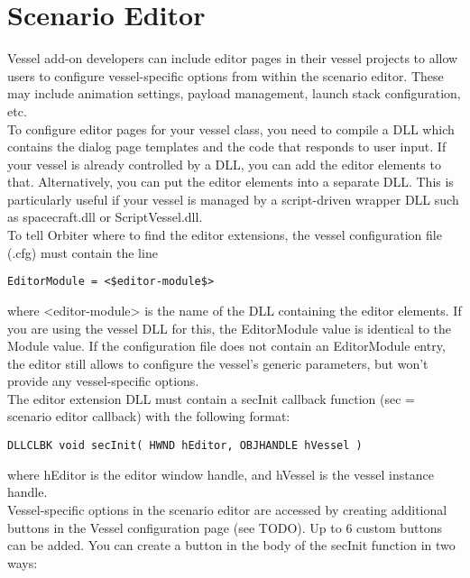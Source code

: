 \documentclass[Orbiter Developer Manual.tex]{subfiles}
\begin{document}
\section{Scenario Editor}
Vessel add-on developers can include editor pages in their vessel projects to allow users to configure vessel-specific options from within the scenario editor. These may include animation settings, payload management, launch stack configuration, etc.\\
To configure editor pages for your vessel class, you need to compile a DLL which contains the dialog page templates and the code that responds to user input. If your vessel is already controlled by a DLL, you can add the editor elements to that. Alternatively, you can put the editor elements into a separate DLL. This is particularly useful if your vessel is managed by a script-driven wrapper DLL such as spacecraft.dll or ScriptVessel.dll.\\
To tell Orbiter where to find the editor extensions, the vessel configuration file (.cfg) must contain the line

\begin{lstlisting}[language=OSFS,mathescape=true]
EditorModule = <$editor-module$>
\end{lstlisting}

\noindent
where <editor-module> is the name of the DLL containing the editor elements. If you are using the vessel DLL for this, the EditorModule value is identical to the Module value. If the configuration file does not contain an EditorModule entry, the editor still allows to configure the vessel's generic parameters, but won't provide any vessel-specific options.\\
The editor extension DLL must contain a secInit callback function (sec = scenario editor callback) with the following format:

\begin{lstlisting}
DLLCLBK void secInit( HWND hEditor, OBJHANDLE hVessel )
\end{lstlisting}

\noindent
where hEditor is the editor window handle, and hVessel is the vessel instance handle.\\
Vessel-specific options in the scenario editor are accessed by creating additional buttons in the Vessel configuration page (see TODO). Up to 6 custom buttons can be added. You can create a button in the body of the secInit function in two ways:
\end{document}
